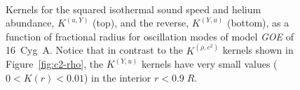 \begin{figure}
    \centering%
    \\%
    \caption[${(u,Y)}$ kernels for 16~Cyg~A]{Kernels for the squared isothermal sound speed and helium abundance, $K^{(u, Y)}$ (top), and the reverse, $K^{(Y, u)}$ (bottom), as a function of fractional radius for oscillation modes of model \emph{GOE} of 16~Cyg~A. Notice that in contrast to the $K^{(\rho, c^2)}$ kernels shown in Figure~\ref{fig:c2-rho}, the $K^{(Y, u)}$ kernels have very small values (${0 < K(r) < 0.01}$) in the interior ${r < 0.9\; R}$. \label{fig:same-n-uY} }
\end{figure}


